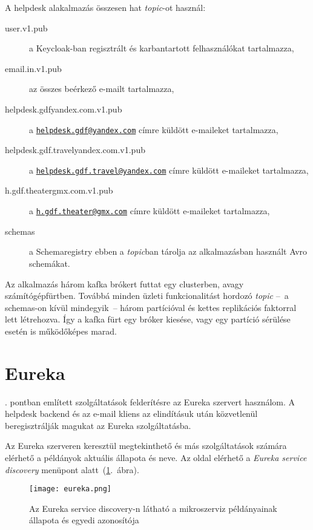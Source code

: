 A helpdesk alakalmazás összesen hat \emph{topic}-ot használ:
\begin{description}
	\item[user.v1.pub] a Keycloak-ban regisztrált és karbantartott felhasználókat tartalmazza,
	
	\item[email.in.v1.pub] az összes beérkező  e-mailt tartalmazza,
	
	\item[helpdesk.gdf\textunderscore yandex.com.v1.pub] a  \href{mailto:helpdesk.gdf@yandex.com}{\nolinkurl{helpdesk.gdf@yandex.com}} címre küldött e-maileket tartalmazza,
	
	\item[helpdesk.gdf.travel\textunderscore yandex.com.v1.pub] a \href{mailto:helpdesk.gdf.travel@yandex.com}{\nolinkurl{helpdesk.gdf.travel@yandex.com}} címre küldött e-maileket tartalmazza,
	
	
	\item[h.gdf.theater\textunderscore gmx.com.v1.pub] a \href{mailto:h.gdf.theater@gmx.com}{\nolinkurl{h.gdf.theater@gmx.com}} címre küldött e-maileket tartalmazza,
	
	\item[\textunderscore schemas] a Schemaregistry ebben a \emph{topic}ban tárolja az alkalmazásban használt Avro schemákat.
\end{description}


Az alkalmazás három kafka brókert futtat egy clusterben, avagy számítógépfürtben. Továbbá minden üzleti funkcionalitást hordozó \emph{topic} --~a \textunderscore schemas-on kívül mindegyik~-- három partícióval és kettes replikációs faktorral lett létrehozva.
Így a kafka fürt egy bróker kiesése, vagy egy partíció sérülése esetén is működőképes marad.


\section{Eureka}\label{sec:bemutatas_eureka}
. pontban említett szolgáltatások felderítésre az Eureka szervert használom. A helpdesk backend és az e-mail kliens az elindításuk után közvetlenül beregisztrálják magukat az Eureka szolgáltatásba.

Az Eureka szerveren keresztül megtekinthető és más szolgáltatások számára elérhető a példányok aktuális állapota és neve. Az oldal elérhető a \emph{Eureka service discovery} menüpont alatt~(\ref{fig:eureka}.~ábra).


\begin{figure}[hbt] 
	\centering
	\texttt{[image: eureka.png]}
	\caption[Az Eureka service discovery felülete]{Az Eureka service discovery-n látható a mikroszerviz példányainak állapota és egyedi azonosítója}
	\label{fig:eureka}
\end{figure}

